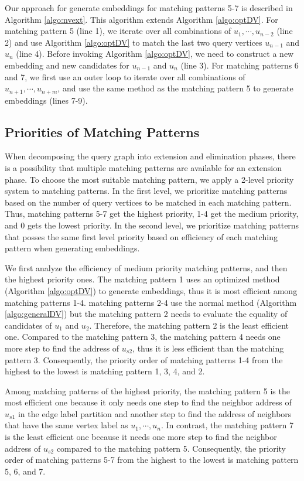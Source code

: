 Our approach for generate embeddings for matching patterns 5-7 is described in Algorithm \ref{algo:nvext}. This algorithm extends Algorithm
\ref{algo:optDV}. For matching pattern 5 (line 1), we iterate over all combinations of $u_1, \cdots, u_{n-2}$ (line 2) and use Algorithm
\ref{algo:optDV} to match the last two query vertices $u_{n-1}$ and $u_n$ (line 4). Before invoking Algorithm \ref{algo:optDV}, we need to
construct a new embedding and new candidates for $u_{n-1}$ and $u_n$ (line 3). For matching patterns 6 and 7, we first use an outer loop to
iterate over all combinations of $u_{n+1}, \cdots, u_{n+m}$, and use the same method as the matching pattern 5 to generate embeddings
(lines 7-9).


\subsection{Priorities of Matching Patterns\label{sec:spm}}
When decomposing the query graph into extension and elimination phases, there is a possibility that multiple matching patterns are
available for an extension phase. To choose the most suitable matching pattern, we apply a 2-level priority system to matching patterns. In
the first level, we prioritize matching patterns based on the number of query vertices to be matched in each matching pattern. Thus,
matching patterns 5-7 get the highest priority, 1-4 get the medium priority, and 0 gets the lowest priority. In the second level, we
prioritize matching patterns that posses the same first level priority based on efficiency of each matching pattern when generating
embeddings.

We first analyze the efficiency of medium priority matching patterns, and then the highest priority ones. The matching pattern 1 uses an optimized method (Algorithm \ref{algo:optDV}) to generate embeddings, thus it is most efficient among matching patterns 1-4. matching patterns 2-4 use the normal method (Algorithm \ref{algo:generalDV}) but the matching pattern 2 needs to evaluate the equality of candidates of $u_1$ and $u_2$. Therefore, the matching pattern 2 is the least efficient one. Compared to the matching pattern 3, the matching pattern 4 needs one more step to find the address of $u_{s2}$, thus it is less efficient than the matching pattern 3. Consequently, the priority order of matching patterns 1-4 from the highest to the lowest is matching pattern 1, 3, 4, and 2.

Among matching patterns of the highest priority, the matching pattern 5 is the most efficient one because it only needs one step to find the neighbor address of $u_{s1}$ in the edge label partition and another step to find the address of neighbors that have the same vertex label as $u_1, \cdots, u_n$. In contrast, the matching pattern 7 is the least efficient one because it needs one more step to find the neighbor address of $u_{s2}$ compared to the matching pattern 5. Consequently, the priority order of matching patterns 5-7 from the highest to the lowest is matching pattern 5, 6, and 7.


